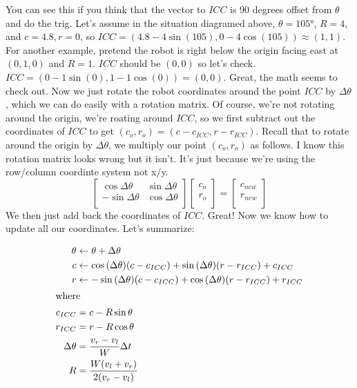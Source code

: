 \documentclass{article}
\begin{document}
You can see this if you think that the vector to $ICC$ is 90 degrees offset from $\theta$ and do the trig. Let's assume in the situation diagramed above, $\theta=\ang{105}$, $R=4$, and $c=4.8, r=0$, so $ICC = (4.8-4\sin{(105)}, 0-4\cos{(105)}) \approx (1, 1)$. For another example, pretend the robot is right below the origin facing east at $(0,1,0)$ and $R=1$. $ICC$ should be $(0,0)$ so let's check. $ICC = (0-1\sin{(0)}, 1-1\cos{(0)}) = (0, 0).$ Great, the math seems to check out. Now we just rotate the robot coordinates around the point $ICC$ by $\Delta\theta$, which we can do easily with a rotation matrix. Of course, we're not rotating around the origin, we're roating around $ICC$, so we first subtract out the coordinates of $ICC$ to get $(c_o, r_o) = (c-c_{ICC}, r-r_{ICC})$. Recall that to rotate around the origin by $\Delta\theta$, we multiply our point $(c_o, r_o)$ as follows. I know this rotation matrix looks wrong but it isn't. It's just because we're using the row/column coordinte system not x/y.
\begin{equation}
  \begin{bmatrix}
    \cos{\Delta\theta} & \sin{\Delta\theta} \\
    -\sin{\Delta\theta} & \cos{\Delta\theta} \\
  \end{bmatrix}
  \begin{bmatrix}
    c_o \\
    r_o \\
  \end{bmatrix}
  =
  \begin{bmatrix}
    c_{new} \\
    r_{new} \\
  \end{bmatrix}
\end{equation}
We then just add back the coordinates of $ICC$. Great! Now we know how to update all our coordinates. Let's summarize:

\begin{align}
 \theta &\leftarrow \theta + \Delta\theta \\
  c &\leftarrow \cos{(\Delta\theta)}(c-c_{ICC})+\sin{(\Delta\theta)}(r-r_{ICC}) + c_{ICC} \\
  r &\leftarrow -\sin{(\Delta\theta)}(c-c_{ICC})+\cos{(\Delta\theta)}(r-r_{ICC}) + r_{ICC} \\
\shortintertext{where}
  c_{ICC} &= c-R\sin{\theta} \\
  r_{ICC} &= r-R\cos{\theta} \\
  \Delta\theta &= \frac{v_r-v_l}{W}\Delta t \\
  R &= \frac{W(v_l+v_r)}{2(v_r-v_l)}
\end{align}
\end{document}
